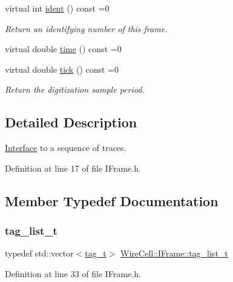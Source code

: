 \begin{DoxyCompactItemize}
virtual int \hyperlink{class_wire_cell_1_1_i_frame_adbd5a27db1364bd8f5d89e1e7ca3c938}{ident} () const =0
\begin{DoxyCompactList}\small\item\em Return an identifying number of this frame. \end{DoxyCompactList}\item 
virtual double \hyperlink{class_wire_cell_1_1_i_frame_ae65ceeb2ebe5ef5371793a21a835b0df}{time} () const =0
\item 
virtual double \hyperlink{class_wire_cell_1_1_i_frame_a5003631e8cb3f013c6ab84f26e09b852}{tick} () const =0
\begin{DoxyCompactList}\small\item\em Return the digitization sample period. \end{DoxyCompactList}\end{DoxyCompactItemize}


\subsection{Detailed Description}
\hyperlink{class_wire_cell_1_1_interface}{Interface} to a sequence of traces. 

Definition at line 17 of file I\+Frame.\+h.



\subsection{Member Typedef Documentation}
\mbox{\label{class_wire_cell_1_1_i_frame_ab34485d40e352997c21b9ec99504ba7c}} 
\subsubsection{\texorpdfstring{tag\+\_\+list\+\_\+t}{tag\_list\_t}}
{\footnotesize\ttfamily typedef std\+::vector$<$\hyperlink{class_wire_cell_1_1_i_frame_ae206ba618e10f398625dfeb675a4215a}{tag\+\_\+t}$>$ \hyperlink{class_wire_cell_1_1_i_frame_ab34485d40e352997c21b9ec99504ba7c}{Wire\+Cell\+::\+I\+Frame\+::tag\+\_\+list\+\_\+t}}



Definition at line 33 of file I\+Frame.\+h.

